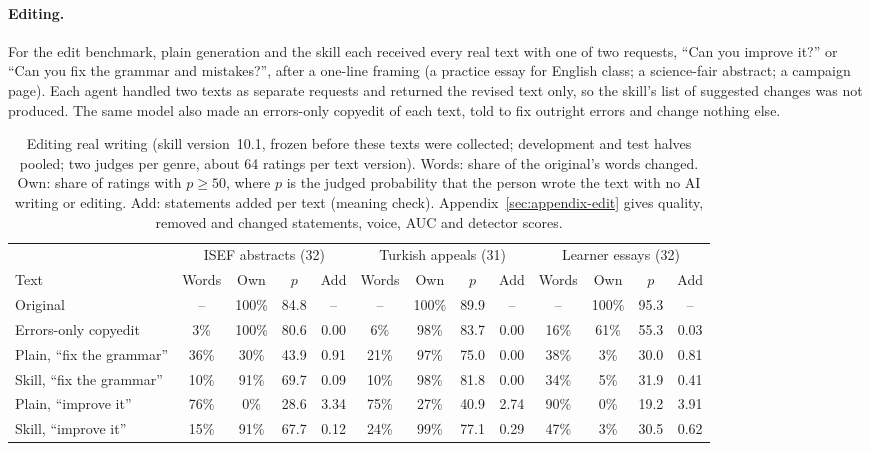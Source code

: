 \documentclass[11pt]{article}
\begin{document}
\paragraph{Editing.} For the edit benchmark, plain generation and the skill each received every real text with one of two requests, ``Can you improve it?'' or ``Can you fix the grammar and mistakes?'', after a one-line framing (a practice essay for English class; a science-fair abstract; a campaign page). Each agent handled two texts as separate requests and returned the revised text only, so the skill's list of suggested changes was not produced. The same model also made an errors-only copyedit of each text, told to fix outright errors and change nothing else.

\begin{table}[t]
\centering\small
\setlength{\tabcolsep}{4pt}
\begin{tabular}{lcccc@{\hspace{12pt}}cccc@{\hspace{12pt}}cccc}
\toprule
 & \multicolumn{4}{c}{ISEF abstracts (32)} & \multicolumn{4}{c}{Turkish appeals (31)} & \multicolumn{4}{c}{Learner essays (32)} \\
\cmidrule(lr){2-5}\cmidrule(lr){6-9}\cmidrule(lr){10-13}
Text & Words & Own & $p$ & Add & Words & Own & $p$ & Add & Words & Own & $p$ & Add \\
\midrule
Original & -- & 100\% & 84.8 & -- & -- & 100\% & 89.9 & -- & -- & 100\% & 95.3 & -- \\
Errors-only copyedit & 3\% & 100\% & 80.6 & 0.00 & 6\% & 98\% & 83.7 & 0.00 & 16\% & 61\% & 55.3 & 0.03 \\
Plain, ``fix the grammar'' & 36\% & 30\% & 43.9 & 0.91 & 21\% & 97\% & 75.0 & 0.00 & 38\% & 3\% & 30.0 & 0.81 \\
Skill, ``fix the grammar'' & 10\% & 91\% & 69.7 & 0.09 & 10\% & 98\% & 81.8 & 0.00 & 34\% & 5\% & 31.9 & 0.41 \\
Plain, ``improve it'' & 76\% & 0\% & 28.6 & 3.34 & 75\% & 27\% & 40.9 & 2.74 & 90\% & 0\% & 19.2 & 3.91 \\
Skill, ``improve it'' & 15\% & 91\% & 67.7 & 0.12 & 24\% & 99\% & 77.1 & 0.29 & 47\% & 3\% & 30.5 & 0.62 \\
\bottomrule
\end{tabular}
\caption{Editing real writing (skill version~10.1, frozen before these texts were collected; development and test halves pooled; two judges per genre, about 64 ratings per text version). Words: share of the original's words changed. Own: share of ratings with $p \geq 50$, where $p$ is the judged probability that the person wrote the text with no AI writing or editing. Add: statements added per text (meaning check). Appendix~\ref{sec:appendix-edit} gives quality, removed and changed statements, voice, AUC and detector scores.}
\label{tab:edit}
\end{table}
\end{document}
